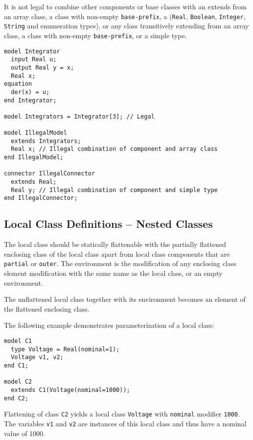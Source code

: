 It is not legal to combine other components or base classes with an extends from an array class, a class with non-empty \lstinline[language=grammar]!base-prefix!, a  (\lstinline!Real!, \lstinline!Boolean!, \lstinline!Integer!, \lstinline!String! and enumeration types), or any class transitively extending from an array class, a class with non-empty \lstinline[language=grammar]!base-prefix!, or a simple type.

\begin{example}
\begin{lstlisting}[language=modelica]
model Integrator
  input Real u;
  output Real y = x;
  Real x;
equation
  der(x) = u;
end Integrator;

model Integrators = Integrator[3]; // Legal

model IllegalModel
  extends Integrators;
  Real x; // Illegal combination of component and array class
end IllegalModel;

connector IllegalConnector
  extends Real;
  Real y; // Illegal combination of component and simple type
end IllegalConnector;
\end{lstlisting}
\end{example}

\subsection{Local Class Definitions -- Nested Classes}\label{local-class-definitions-nested-classes}

The local class should be statically flattenable with the partially flattened enclosing class of the local class apart from local class components that are \lstinline!partial! or \lstinline!outer!.  The environment is the modification of any enclosing class element modification with the same name as the local class, or an empty environment.

The unflattened local class together with its environment becomes an
element of the flattened enclosing class.

\begin{example}
The following example demonstrates parameterization of a local class:
\begin{lstlisting}[language=modelica]
model C1
  type Voltage = Real(nominal=1);
  Voltage v1, v2;
end C1;

model C2
  extends C1(Voltage(nominal=1000));
end C2;
\end{lstlisting}

Flattening of class \lstinline!C2! yields a local class \lstinline!Voltage! with \lstinline!nominal! modifier \lstinline!1000!.
The variables \lstinline!v1! and \lstinline!v2! are instances of this local class and thus have a nominal value of 1000.
\end{example}

